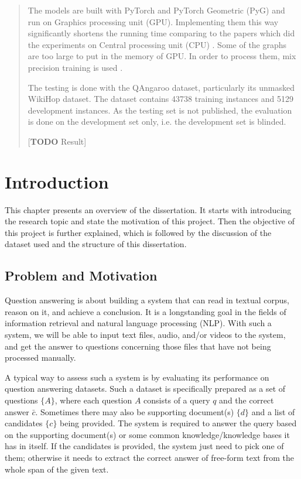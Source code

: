 \documentclass[12pt]{report}
\begin{document}
\begin{abstract}
\begin{singlespace}
The models are built with PyTorch and PyTorch Geometric (PyG) and run on Graphics processing unit (GPU). Implementing them this way significantly shortens the running time comparing to the papers which did the experiments on Central processing unit (CPU) \cite{schlichtkrull_modeling_2018, de_cao_question_2019}. Some of the graphs are too large to put in the memory of GPU. In order to process them, mix precision training is used \cite{micikevicius_mixed_2017}.

The testing is done with the QAngaroo \cite{welbl_constructing_2018} dataset, particularly its unmasked WikiHop dataset. The dataset contains 43738 training instances and 5129 development instances. As the testing set is not published, the evaluation is done on the development set only, i.e. the development set is blinded.

[\textbf{TODO} Result]

\end{singlespace}
\end{abstract}

\tableofcontents

\listoffigures
\listoftables


\chapter{Introduction}
This chapter presents an overview of the dissertation. It starts with introducing the research topic and state the motivation of this project. Then the objective of this project is further explained, which is followed by the discussion of the dataset used and the structure of this dissertation.

\section{Problem and Motivation}
Question answering is about building a system that can read in textual corpus, reason on it, and achieve a conclusion. It is a longstanding goal in the fields of information retrieval and natural language processing (NLP). With such a system, we will be able to input text files, audio, and/or videos to the system, and get the answer to questions concerning those files that have not being processed manually.

A typical way to assess such a system is by evaluating its performance on question answering datasets. Such
a dataset is specifically prepared as a set of questions $\{A\}$, where each question $A$ consists of
a query $q$ and the correct answer $\bar{c}$. Sometimes there may also be supporting document(s) $\{d\}$
and a list of candidates $\{c\}$ being provided. The system is required to answer the query based on
the supporting document(s) or some common knowledge/knowledge bases it has in itself. If the candidates
is provided, the system just need to pick one of them; otherwise it needs to extract the correct answer
of free-form text from the whole span of the given text.
\end{document}
